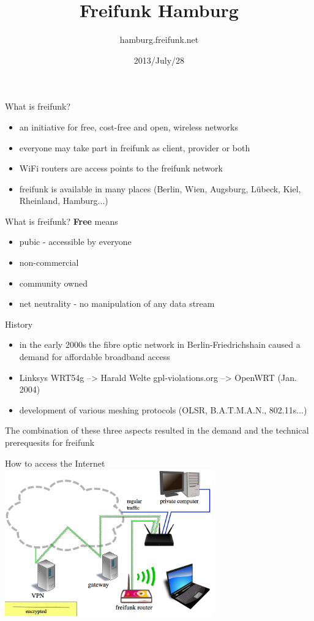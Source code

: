 \documentclass[c]{beamer}
\title{Freifunk Hamburg}
\author{hamburg.freifunk.net}
\date{2013/July/28}
\begin{document}
\maketitle

\begin{frame}{What is freifunk?}
	\begin{itemize}
		\item an initiative for free, cost-free and open, wireless networks
		\item everyone may take part in freifunk as client, provider or both
		\item WiFi routers are access points to the freifunk network
		\item freifunk is available in many places (Berlin, Wien, Augsburg, Lübeck, Kiel, Rheinland, Hamburg...)
	\end{itemize}
\end{frame}


\begin{frame}{What is  freifunk?}
	\textbf{Free} means
	\begin{itemize}
		\item pubic - accessible by everyone
		\item non-commercial
		\item community owned
		\item net neutrality - no manipulation of any data stream
	\end{itemize}
\end{frame}


\begin{frame}{History}
	\begin{itemize}
		\item in the early 2000s the fibre optic network in Berlin-Friedrichshain caused a demand for affordable broadband access
		\item Linksys WRT54g --> Harald Welte gpl-violations.org --> OpenWRT (Jan. 2004)
		\item development of various meshing protocols (OLSR, B.A.T.M.A.N., 802.11s...)
	\end{itemize}
	\begin{center}
		The combination of these three aspects resulted in the demand and the technical prerequesits for freifunk
	\end{center}
\end{frame}


\begin{frame}{How to access the Internet}
	\includegraphics[height=180pt]{Bilder/Knotenanbindung_en}
\end{frame}
\end{document}
